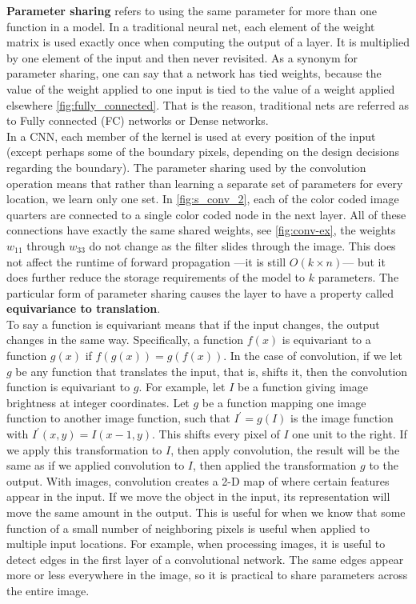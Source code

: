 \textbf{Parameter sharing} refers to using the same parameter for more than one function in a model. In a traditional neural net, each
element of the weight matrix is used exactly once when computing the output of a layer. It is multiplied by one element of the input and
then never revisited. As a synonym for parameter sharing, one can say that a network has tied weights, because the value of the
weight applied to one input is tied to the value of a weight applied elsewhere \cref{fig:fully_connected}.
That is the reason, traditional nets are referred as to Fully connected (FC) networks or Dense networks.\\

In a CNN, each member of the kernel is used at every position
of the input (except perhaps some of the boundary pixels, depending on the
design decisions regarding the boundary). The parameter sharing used by the
convolution operation means that rather than learning a separate set of parameters
for every location, we learn only one set. In \cref{fig:s_conv_2}, each of the color coded image quarters are connected to a single color
coded node in the next layer. All of these connections have exactly the same shared weights, see \cref{fig:conv-ex}, the weights $w_{11}$
through $w_{33}$ do not change as the filter slides through the image. This does not affect the runtime of
forward propagation —it is still $O(k \times n)$— but it does further reduce the storage
requirements of the model to $k$ parameters. The particular form of parameter sharing causes the
layer to have a property called \textbf{equivariance to translation}. \\

To say a function is equivariant means that if the input changes, the output changes in the same way.
Specifically, a function $f(x)$ is equivariant to a function $g(x)$ if $f(g(x)) = g(f(x))$. In
the case of convolution, if we let $g$ be any function that translates the input, that
is, shifts it, then the convolution function is equivariant to $g$. For example, let $I$
be a function giving image brightness at integer coordinates. Let $g$ be a function
mapping one image function to another image function, such that $I^{\prime} = g(I)$ is the
image function with $I^{\prime}(x, y) = I(x - 1, y)$. This shifts every pixel of $I$ one unit to
the right. If we apply this transformation to $I$, then apply convolution, the result
will be the same as if we applied convolution to $I$, then applied the transformation
$g$ to the output. With images, convolution creates a 2-D map of where certain features appear in the input. If we move the object in the
input, its representation will move the same amount in the output. This is useful for when we know that some function of a small number of
neighboring pixels is useful when applied to multiple input locations. For example, when processing
images, it is useful to detect edges in the first layer of a convolutional network.
The same edges appear more or less everywhere in the image, so it is practical to share parameters across the entire image. \\

